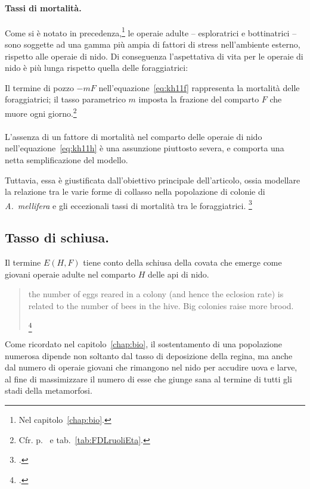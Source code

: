 \paragraph{Tassi di mortalità.}
Come si è notato in precedenza,\footnote{Nel capitolo~\ref{chap:bio}.}
le operaie adulte -- esploratrici e bottinatrici -- sono soggette ad una gamma più ampia di fattori di stress
nell'ambiente esterno, rispetto alle operaie di nido. Di conseguenza l'aspettativa di vita per le operaie di
nido è più lunga rispetto quella delle foraggiatrici:

Il termine di pozzo $-mF$ nell'equazione~\eqref{eq:kh11f} rappresenta la mortalità delle foraggiatrici;
il tasso parametrico $m$ imposta la frazione del comparto $F$ che muore ogni giorno.\footnote{Cfr. %
p.~\pageref{par:mInverseFlightspan} e tab.~\ref{tab:FDLruoliEta}.}


\paragraph{}
L'assenza di un fattore di mortalità nel comparto delle operaie di nido nell'equazione~\eqref{eq:kh11h} è
una assunzione piuttosto severa, e comporta una netta semplificazione del modello.

Tuttavia, essa è giustificata dall'obiettivo principale dell'articolo, ossia modellare la relazione tra le varie
forme di collasso nella popolazione di colonie di \emph{A.~mellifera} e gli eccezionali tassi di mortalità
tra le foraggiatrici.
\footcite[1,2,3,5]{khoury2011}

\subsection{Tasso di schiusa.}
\label{sec:eclos}
Il termine $E(H,F)$ tiene conto della schiusa della covata che emerge come giovani operaie adulte nel
comparto $H$ delle api di nido.
\blockquote[{\footcite[2]{khoury2011}}]{\omissis the number of eggs reared in a colony (and hence the eclosion rate) is related to the number of bees in the hive. Big colonies raise more brood.}

Come ricordato nel capitolo~\ref{chap:bio}, il sostentamento di una popolazione numerosa dipende non soltanto
dal tasso di deposizione della regina, ma anche dal numero di operaie giovani che rimangono nel nido per
accudire uova e larve, al fine di massimizzare il numero di esse che giunge sana al termine di tutti gli stadi
della metamorfosi.

